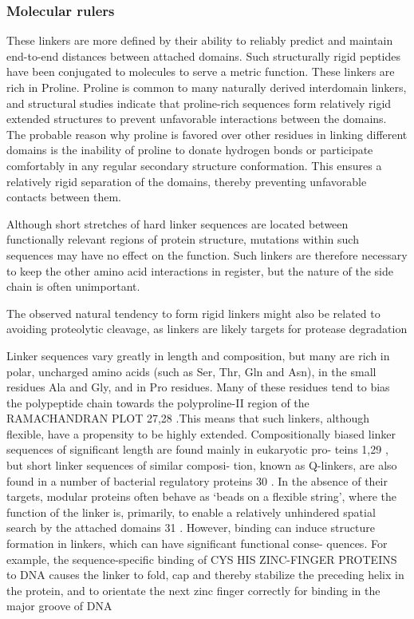\subsubsection{Molecular rulers}
These linkers are more defined by their ability to reliably predict and maintain end-to-end distances between attached domains. 
Such structurally rigid peptides have been conjugated to molecules to serve a metric function.
These linkers are rich in Proline. 
Proline is common to many naturally derived interdomain linkers, and structural studies indicate that proline-rich sequences form relatively rigid extended structures to prevent unfavorable interactions between the domains.
The probable reason why proline is favored over other residues in linking different domains is the inability of proline to donate hydrogen bonds or participate comfortably in any regular secondary structure conformation. This ensures a relatively rigid separation of the domains, thereby preventing unfavorable contacts between them.

Although short stretches of hard linker sequences are located between functionally relevant regions of protein structure, mutations within such sequences may have no effect on the function.  
Such linkers are therefore necessary to keep the other amino acid interactions in register, but the nature of the side chain is often unimportant.

The observed natural tendency to form rigid linkers might also
be related to avoiding proteolytic cleavage, as linkers are likely
targets for protease degradation

Linker
sequences vary greatly in length and composition, but
many are rich in polar, uncharged amino acids (such as
Ser, Thr, Gln and Asn), in the small residues Ala and Gly,
and in Pro residues. Many of these residues tend to bias
the polypeptide chain towards the polyproline-II region
of the RAMACHANDRAN PLOT 27,28 .This means that such
linkers, although flexible, have a propensity to be highly
extended. Compositionally biased linker sequences of
significant length are found mainly in eukaryotic pro-
teins 1,29 , but short linker sequences of similar composi-
tion, known as Q-linkers, are also found in a number of
bacterial regulatory proteins 30 .
In the absence of their targets, modular proteins
often behave as ‘beads on a flexible string’, where the
function of the linker is, primarily, to enable a relatively
unhindered spatial search by the attached domains 31 .
However, binding can induce structure formation in
linkers, which can have significant functional conse-
quences. For example, the sequence-specific binding of
CYS HIS ZINC-FINGER PROTEINS to DNA causes the linker to
fold, cap and thereby stabilize the preceding helix in the
protein, and to orientate the next zinc finger correctly
for binding in the major groove of DNA













